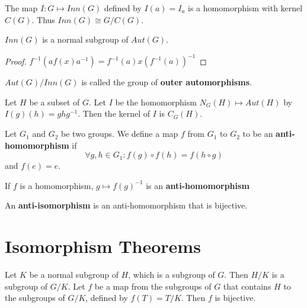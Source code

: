 \documentclass[12pt]{book}
\begin{document}
\begin{lemma}
	The map $I:G\mapsto Inn(G)$ defined by $I(a)=I_a$ is a homomorphism with kernel $C(G)$. Thus $Inn(G)\cong G/C(G)$. 
\end{lemma}
		
\begin{lemma}
	$Inn(G)$ is a normal subgroup of $Aut(G)$. 
\end{lemma}
\begin{proof}
	$f^{-1}(af(x)a^{-1})=f^{-1}(a)x(f^{-1}(a))^{-1}$
\end{proof}
		
\begin{definition}
	$Aut(G)/Inn(G)$ is called the group of {\bf outer automorphisms}.
\end{definition}

\begin{lemma}
	Let $H$ be a subset of $G$. Let $I$ be the homomorphism $N_G(H)\mapsto Aut(H)$ by $I(g)(h)=ghg^{-1}$. Then the kernel of $I$ is $C_G(H)$.
\end{lemma}
\begin{definition}
	Let $G_1$ and $G_2$ be two groups. We define a map $f$ from $G_1$ to $G_2$ to be an {\bf anti-homomorphism} if
	\begin{equation}
		\forall g,h\in G_1:f(g)\circ f(h)=f(h\circ g)
	\end{equation}
	and $f(e)=e$.
\end{definition}
	
\begin{lemma}
	If $f$ is a homomorphism, $g\mapsto f(g)^{-1}$ is an \textbf{anti-homomorphism}
\end{lemma}
\begin{definition}
	An \textbf{anti-isomorphism} is an anti-homomorphism that is bijective.
\end{definition}
	
	
\section{Isomorphism Theorems}
	\begin{theorem}
		Let $K$ be a normal subgroup of $H$, which is a subgroup of $G$. Then $H/K$ is a subgroup of $G/K$. Let $f$ be a map from the subgroups of $G$ that contains $H$ to the subgroups of $G/K$, defined by $f(T)=T/K$. Then $f$ is bijective.
	\end{theorem}
	
\end{document}
